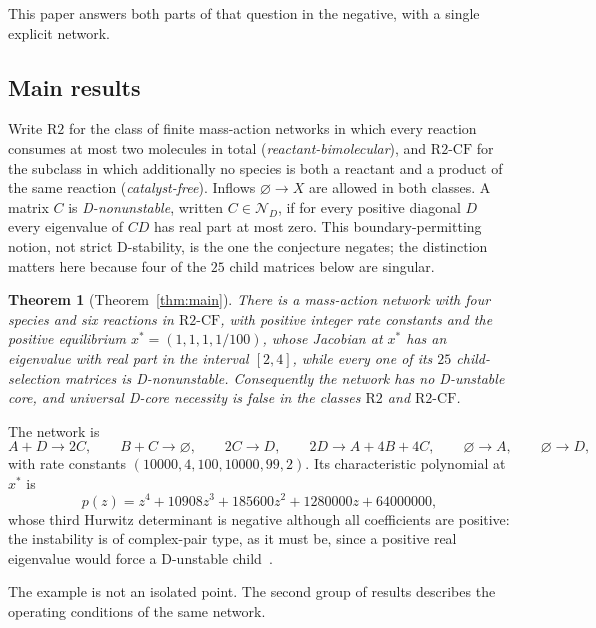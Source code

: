 \documentclass[11pt,a4paper]{article}
\theoremstyle{plain}
\newtheorem{theorem}{Theorem}[section]
\theoremstyle{definition}
\theoremstyle{remark}
\newcommand{\DN}{\mathcal{N}_D}
\newcommand{\xs}{x^{*}}
\newcommand{\Ract}{\mathrm{R2}}
\newcommand{\Rcf}{\mathrm{R2\text{-}CF}}
\begin{document}
This paper answers both parts of that question in the negative, with a single explicit network.

\subsection{Main results}

Write $\Ract$ for the class of finite mass-action networks in which every reaction consumes at most two molecules in total (\emph{reactant-bimolecular}), and $\Rcf$ for the subclass in which additionally no species is both a reactant and a product of the same reaction (\emph{catalyst-free}). Inflows $\varnothing\to X$ are allowed in both classes. A matrix $C$ is \emph{D-nonunstable}, written $C\in\DN$, if for every positive diagonal $D$ every eigenvalue of $CD$ has real part at most zero. This boundary-permitting notion, not strict D-stability, is the one the conjecture negates; the distinction matters here because four of the $25$ child matrices below are singular.

\begin{theorem}[Theorem~\ref{thm:main}]\label{thm:A}
There is a mass-action network with four species and six reactions in $\Rcf$, with positive integer rate constants and the positive equilibrium $\xs=(1,1,1,1/100)$, whose Jacobian at $\xs$ has an eigenvalue with real part in the interval $[2,4]$, while every one of its $25$ child-selection matrices is D-nonunstable. Consequently the network has no D-unstable core, and universal D-core necessity is false in the classes $\Ract$ and $\Rcf$.
\end{theorem}

The network is
\[
A+D\to2C,\qquad B+C\to\varnothing,\qquad 2C\to D,\qquad 2D\to A+4B+4C,\qquad \varnothing\to A,\qquad\varnothing\to D,
\]
with rate constants $(10000,4,100,10000,99,2)$. Its characteristic polynomial at $\xs$ is
\[
p(z)=z^4+10908z^3+185600z^2+1280000z+64000000,
\]
whose third Hurwitz determinant is negative although all coefficients are positive: the instability is of complex-pair type, as it must be, since a positive real eigenvalue would force a D-unstable child~\cite{ParameterRich2026}.

The example is not an isolated point. The second group of results describes the operating conditions of the same network.
\end{document}
